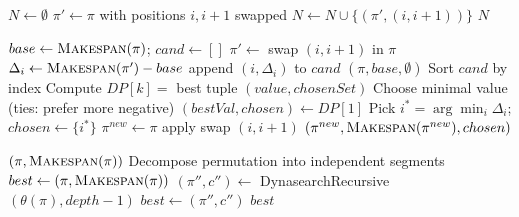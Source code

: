 \documentclass[runningheads]{llncs}
\newcommand{\perm}{\pi}
\begin{document}
{\scriptsize
\setlength{\abovedisplayskip}{2pt}
\setlength{\belowdisplayskip}{2pt}

\begin{algorithm}[H]
  \caption{GenerateAdjacent($\perm$)}
  \begin{algorithmic}[1]
    \State $N \gets \emptyset$
      \State $\perm' \gets \perm$ with positions $i,i+1$ swapped
      \State $N \gets N \cup \{(\perm', (i,i+1))\}$
    \EndFor
    \State \Return $N$
  \end{algorithmic}
\end{algorithm}

\begin{algorithm}[H]
  \caption{Composite Disjoint-Adjacent (\emph{Fibonacci}) Neighborhood}
  \begin{algorithmic}[1]
    \State $base \gets \textsc{Makespan}(\perm)$; $cand \gets []$
      \State $\perm' \gets$ swap $(i,i{+}1)$ in $\perm$
      \State $\Delta_i \gets \textsc{Makespan}(\perm') - base$
      \State append $(i,\Delta_i)$ to $cand$
    \EndFor
     \Return $(\perm, base, \emptyset)$ \EndIf
    \State Sort $cand$ by index
      \State Compute $DP[k] =$ best tuple $(value, chosenSet)$
      \State Choose minimal value (ties: prefer more negative)
    \EndFor
    \State $(bestVal, chosen) \gets DP[1]$
      \State Pick $i^* = \arg\min_i \Delta_i$; $chosen \gets \{i^*\}$
    \EndIf
    \State $\perm^{new} \gets \perm$
     apply swap $(i,i{+}1)$ \EndFor
    \State \Return $(\perm^{new}, \textsc{Makespan}(\perm^{new}), chosen)$
  \end{algorithmic}
\end{algorithm}

\begin{algorithm}[H]
  \caption{DynasearchRecursive$(\perm, depth)$ (Sketch)}
  \begin{algorithmic}[1]
     \Return $(\perm, \textsc{Makespan}(\perm))$ \EndIf
    \State Decompose permutation into independent segments
    \State $best \gets (\perm, \textsc{Makespan}(\perm))$
      \State $(\perm'', c'') \gets$ DynasearchRecursive$(\theta(\perm), depth-1)$
       $best \gets (\perm'', c'')$ \EndIf
    \EndFor
    \Return $best$
  \end{algorithmic}
\end{algorithm}

}
\end{document}
